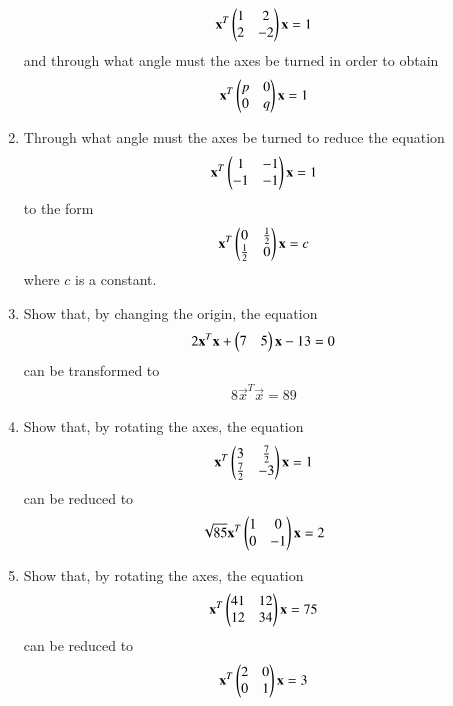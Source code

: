 \begin{enumerate}[label=\arabic*.,ref=\thesubsection.\theenumi]
\begin{align}
    \mathbf{x}^T\begin{pmatrix}1 & 2\\2 & -2\end{pmatrix}\mathbf{x}=1\label{eq:solutions/3/4/6/eq:q2}
\end{align}
and through what angle must the axes be turned in order to obtain
\begin{align}
    \mathbf{x}^T\begin{pmatrix}p & 0\\0 & q\end{pmatrix}\mathbf{x}=1\label{eq:solutions/3/4/6/eq:q3}
\end{align}
\solution

\item Through what angle must the axes be turned to reduce the equation
\begin{align}
\mathbf{x}^T\begin{pmatrix}1 & -1\\-1 & -1\end{pmatrix}\mathbf{x}=1
\end{align}
to the form
\begin{align}
\mathbf{x}^T\begin{pmatrix}0 & \frac{1}{2}\\ \frac{1}{2} & 0\end{pmatrix}\mathbf{x} = c
\end{align}
where $c$ is a constant.
\item 
Show that, by changing the origin, the equation
\begin{align}
2\mathbf{x}^T\mathbf{x}+\begin{pmatrix}7&5\end{pmatrix}\mathbf{x}-13=0
\label{eq:solutions/3/4/8/eq:a0}
\end{align}
can be transformed to
\begin{align}
8\vec{x}^T\vec{x}=89
\label{eq:solutions/3/4/8/eq:a1}
\end{align}
\solution

\item Show that, by rotating the axes, the equation
\begin{align}
\mathbf{x}^T\begin{pmatrix}3 & \frac{7}{2}\\ \frac{7}{2} & -3\end{pmatrix}\mathbf{x}= 1
\end{align}
can be reduced to 
\begin{align}
\sqrt{85}\mathbf{x}^T\begin{pmatrix}1 & 0\\ 0 & -1\end{pmatrix}\mathbf{x}= 2
\end{align}
\item Show that, by rotating the axes, the equation
\begin{align}
\mathbf{x}^T\begin{pmatrix}41 & 12\\ 12 & 34\end{pmatrix}\mathbf{x}= 75
\label{eq:solutions/3/4/10/1}
\end{align}
can be reduced to 
\begin{align}
\mathbf{x}^T\begin{pmatrix}2 & 0\\ 0 & 1\end{pmatrix}\mathbf{x}= 3
\end{align}

\end{enumerate}
